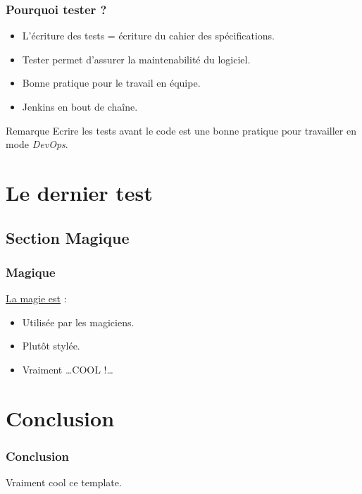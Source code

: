 \documentclass{beamer}
\begin{document}
\begin{frame}
\frametitle{Pourquoi tester ?}

\begin{itemize}
 \item L'écriture des tests = écriture du cahier des spécifications.\pause
 \item Tester permet d'assurer la maintenabilité du logiciel.\pause
 \item Bonne pratique pour le travail en équipe.\pause
 \item Jenkins en bout de chaîne.\pause
\end{itemize}

\begin{block}{Remarque}
Ecrire les tests avant le code est une bonne pratique pour travailler en mode \emph{DevOps}.
\end{block}

\end{frame}

\section{Le dernier test}

\subsection{Section Magique}
\begin{frame}
\frametitle{Magique}

\underline{La magie est} :
\begin{itemize}
 \item Utilisée par les magiciens. \pause
 \item Plutôt stylée. \pause
 \item \og Vraiment \ldots COOL !\ldots \fg{}
\end{itemize}

\end{frame}

\section{Conclusion}

\begin{frame}
\frametitle{Conclusion}

Vraiment cool ce template.


\end{frame}
\end{document}
